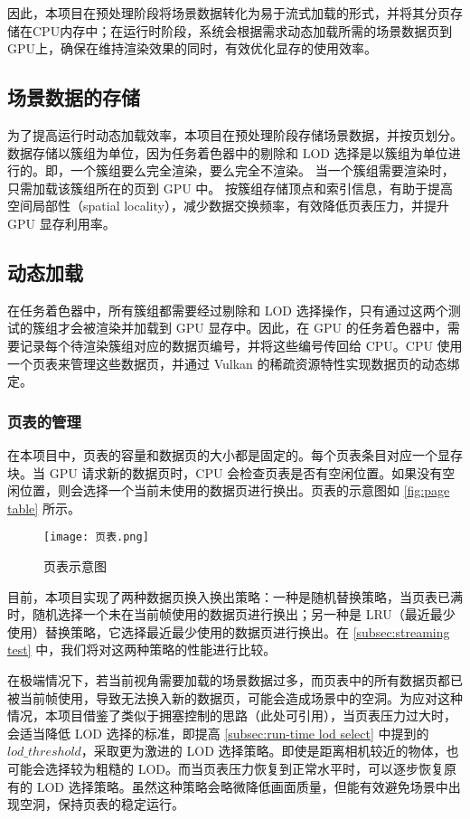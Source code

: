 因此，本项目在预处理阶段将场景数据转化为易于流式加载的形式，并将其分页存储在CPU内存中；在运行时阶段，系统会根据需求动态加载所需的场景数据页到GPU上，确保在维持渲染效果的同时，有效优化显存的使用效率。

\subsection{场景数据的存储}

为了提高运行时动态加载效率，本项目在预处理阶段存储场景数据，并按页划分。数据存储以簇组为单位，因为任务着色器中的剔除和 LOD 选择是以簇组为单位进行的。即，一个簇组要么完全渲染，要么完全不渲染。
当一个簇组需要渲染时，只需加载该簇组所在的页到 GPU 中。  
按簇组存储顶点和索引信息，有助于提高空间局部性（spatial locality），减少数据交换频率，有效降低页表压力，并提升 GPU 显存利用率。

\subsection{动态加载}

在任务着色器中，所有簇组都需要经过剔除和 LOD 选择操作，只有通过这两个测试的簇组才会被渲染并加载到 GPU 显存中。因此，在 GPU 的任务着色器中，需要记录每个待渲染簇组对应的数据页编号，并将这些编号传回给 CPU。CPU 使用一个页表来管理这些数据页，并通过 Vulkan 的稀疏资源特性实现数据页的动态绑定。

\subsubsection{页表的管理}

在本项目中，页表的容量和数据页的大小都是固定的。每个页表条目对应一个显存块。当 GPU 请求新的数据页时，CPU 会检查页表是否有空闲位置。如果没有空闲位置，则会选择一个当前未使用的数据页进行换出。页表的示意图如 \autoref{fig:page table} 所示。

\begin{figure}[!htb]
    \centering
    \texttt{[image: 页表.png]}
    \caption{\label{fig:page table}页表示意图}
\end{figure}

目前，本项目实现了两种数据页换入换出策略：一种是随机替换策略，当页表已满时，随机选择一个未在当前帧使用的数据页进行换出；另一种是 LRU（最近最少使用）替换策略，它选择最近最少使用的数据页进行换出。在 \ref{subsec:streaming test} 中，我们将对这两种策略的性能进行比较。

在极端情况下，若当前视角需要加载的场景数据过多，而页表中的所有数据页都已被当前帧使用，导致无法换入新的数据页，可能会造成场景中的空洞。为应对这种情况，本项目借鉴了类似于拥塞控制的思路（此处可引用），当页表压力过大时，会适当降低 LOD 选择的标准，即提高 \ref{subsec:run-time lod select} 中提到的 $lod\_threshold$，采取更为激进的 LOD 选择策略。即使是距离相机较近的物体，也可能会选择较为粗糙的 LOD。而当页表压力恢复到正常水平时，可以逐步恢复原有的 LOD 选择策略。虽然这种策略会略微降低画面质量，但能有效避免场景中出现空洞，保持页表的稳定运行。

